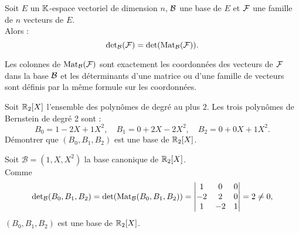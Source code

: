 \documentclass{book}
\begin{document}
\begin{Proposition}
Soit $E$ un $\K$-espace vectoriel de dimension $n$, $\cal B$ une base de $E$ et $\cal F$ une famille de $n$ vecteurs de $E$.\\
Alors : $$\det_{\cal B} (\cal  F ) = \det( \text{Mat}_{\cal B} (\cal F )).$$
\end{Proposition}
\begin{Demonstration}
Les colonnes de $\text{Mat}_{\cal B} (\cal F )$ sont exactement les coordonnées des vecteurs de $\cal F$ dans la base
$\cal B$ et les déterminants d'une matrice ou d'une famille de vecteurs sont définis par la même formule sur les coordonnées.
\end{Demonstration}
\begin{Exemple}
Soit $\R_2[X]$ l'ensemble des polynômes de degré au plus $2$. Les trois  polynômes de Bernstein de degré 2 sont :
$$B_0=1-2X+1X^{2},\quad B_1=0+2X-2X^{2},\quad B_2=0+0X+1X^{2}.$$  
Démontrer que $(B_0,B_1,B_2)$ est une base de $\R_2[X]$.
\begin{Demonstration}
Soit $\mathcal{B}=(1,X,X^2)$ la base canonique de $\R_2[X]$.\\ 
Comme$$\det_{\cal B} (B_0,B_1,B_2 )=\det( \text{Mat}_{\cal B} (B_0,B_1,B_2 ))=\begin{vmatrix}
1&0&0\\
-2&2&0\\
1&-2&1\\
\end{vmatrix}=2\neq 0,$$  $(B_0,B_1,B_2)$ est une base de $\R_2[X]$.
\end{Demonstration}
\end{Exemple}
\end{document}
